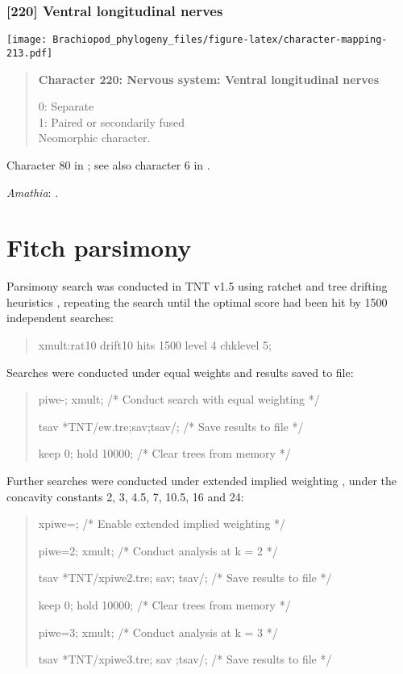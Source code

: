 \documentclass[openany]{book}
\theoremstyle{definition}
\theoremstyle{definition}
\theoremstyle{definition}
\theoremstyle{remark}
\begin{document}
\subsection*{{[}220{]} Ventral longitudinal
nerves}\label{ventral-longitudinal-nerves}

\texttt{[image: Brachiopod\_phylogeny\_files/figure-latex/character-mapping-213.pdf]}

\begin{quote}
\textbf{Character 220: Nervous system: Ventral longitudinal nerves}

0: Separate\\
1: Paired or secondarily fused\\
Neomorphic character.
\end{quote}

Character 80 in \citet{Glenner2004}; see also character 6 in
\citet{Vinther2008}.

\hypertarget{Amathia-coding-220}{}
\emph{Amathia}: \citet{Temereva2016Thenervous}.

\hypertarget{fitch}{\chapter{Fitch parsimony}\label{fitch}}

Parsimony search was conducted in TNT v1.5 \citep{Goloboff2016} using
ratchet and tree drifting heuristics \citep{Goloboff1999, Nixon1999},
repeating the search until the optimal score had been hit by 1500
independent searches:

\begin{quote}
xmult:rat10 drift10 hits 1500 level 4 chklevel 5;
\end{quote}

Searches were conducted under equal weights and results saved to file:

\begin{quote}
piwe-; xmult; {/* Conduct search with equal weighting */}

tsav *TNT/ew.tre;sav;tsav/; {/* Save results to file */}

keep 0; hold 10000; {/* Clear trees from memory */}
\end{quote}

Further searches were conducted under extended implied weighting
\citep{Goloboff1997, Goloboff2014}, under the concavity constants 2, 3,
4.5, 7, 10.5, 16 and 24:

\begin{quote}
xpiwe=; {/* Enable extended implied weighting */}

piwe=2; xmult; {/* Conduct analysis at k = 2 */}

tsav *TNT/xpiwe2.tre; sav; tsav/; {/* Save results to file */}

keep 0; hold 10000; {/* Clear trees from memory */}

piwe=3; xmult; {/* Conduct analysis at k = 3 */}

tsav *TNT/xpiwe3.tre; sav ;tsav/; {/* Save results to file */}
\end{quote}
\end{document}
